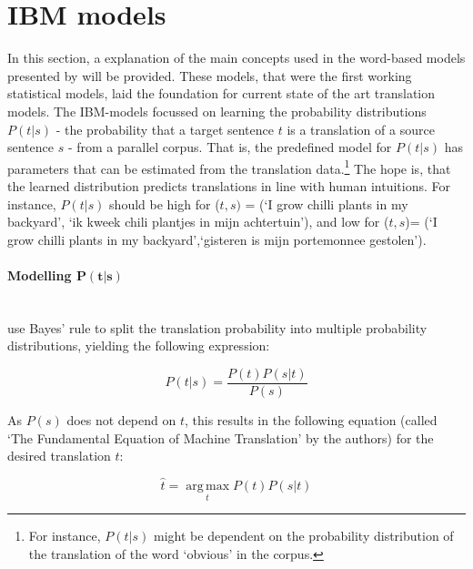 \documentclass{report}
\newcommand{\myparagraph}[1]{\paragraph{#1}\mbox{}\\}
\theoremstyle{definition}
\theoremstyle{plain}
\begin{document}
\section{IBM models}
\label{sec:IBM}

In this section, a explanation of the main concepts used in the word-based models presented by \cite{brown1993mathematics} will be provided. These models, that were the first working statistical models, laid the foundation for current state of the art translation models. The IBM-models focussed on learning the probability distributions $P(t|s)$ - the probability that a target sentence $t$ is a translation of a source sentence $s$ - from a parallel corpus. That is, the predefined model for $P(t|s)$ has parameters that can be estimated from the translation data.\footnote{For instance, $P(t|s)$ might be dependent on the probability distribution of the translation of the word `obvious' in the corpus.} The hope is, that the learned distribution predicts translations in line with human intuitions. For instance, $P(t|s)$ should be high for ($t,s)$ = (`I grow chilli plants in my backyard', `ik kweek chili plantjes in mijn achtertuin'), and low for ($t,s$)= (`I grow chilli plants in my backyard',`gisteren is mijn portemonnee gestolen').

\myparagraph{Modelling $\mathbf{P(t|s)}$}
\citeauthor{brown1988statistical} use Bayes' rule to split the translation probability into multiple probability distributions, yielding the following expression:

\[
P(t|s) = \frac{P(t)P(s|t)}{P(s)}
\]

As $P(s)$ does not depend on $t$, this results in the following equation (called `The Fundamental Equation of Machine Translation' by the authors) for the desired translation $\hat{t}$:

\[
\hat{t} = \operatorname*{arg\,max}_t P(t)P(s|t)
\]
\end{document}
